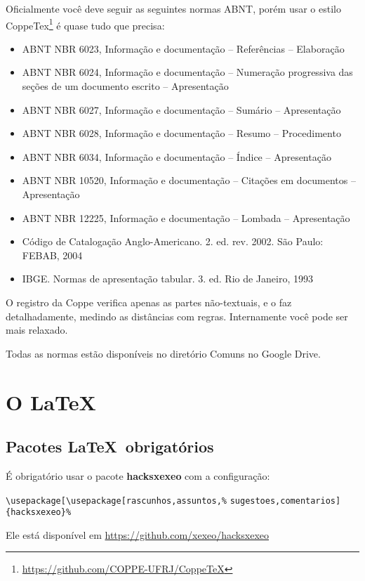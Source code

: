 \documentclass{article}
\begin{document}
Oficialmente você deve seguir as seguintes normas ABNT, porém usar o estilo CoppeTex\footnote{\url{https://github.com/COPPE-UFRJ/CoppeTeX}} é quase tudo que precisa:
\begin{itemize}
    \item ABNT NBR 6023, Informação e documentação – Referências – Elaboração
\item ABNT NBR 6024, Informação e documentação – Numeração progressiva das seções de um documento
escrito – Apresentação
\item ABNT NBR 6027, Informação e documentação – Sumário – Apresentação
\item ABNT NBR 6028, Informação e documentação – Resumo – Procedimento
\item ABNT NBR 6034, Informação e documentação – Índice – Apresentação
\item ABNT NBR 10520, Informação e documentação – Citações em documentos – Apresentação
\item ABNT NBR 12225, Informação e documentação – Lombada – Apresentação
\item Código de Catalogação Anglo-Americano. 2. ed. rev. 2002. São Paulo: FEBAB, 2004
\item IBGE. Normas de apresentação tabular. 3. ed. Rio de Janeiro, 1993
\end{itemize}

O registro da Coppe verifica apenas as partes não-textuais, e o faz detalhadamente, medindo as distâncias com regras. Internamente você pode ser mais relaxado. 

Todas as normas estão disponíveis no diretório Comuns no Google Drive.
    




\section{O \LaTeX}

\subsection{Pacotes \LaTeX\  obrigatórios}

É obrigatório usar o pacote \textbf{hacksxexeo} com a configuração:

\verb!\usepackage[\usepackage[rascunhos,assuntos,%!
\verb!sugestoes,comentarios]{hacksxexeo}%!


Ele está  disponível em \url{https://github.com/xexeo/hacksxexeo}
\end{document}
